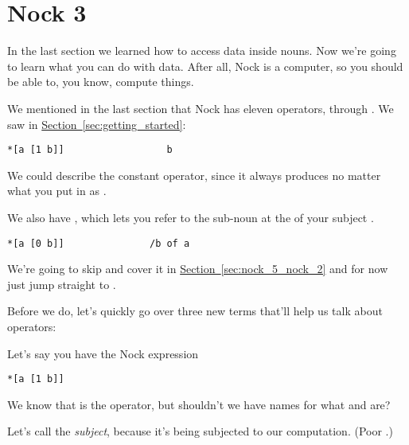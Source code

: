 \section{Nock 3}

\label{sec:nock_3}

In the last section we learned how to access data inside nouns. Now we're going
to learn what you can do with data. After all, Nock is a computer, so you
should be able to, you know, compute things.

We mentioned in the last section that Nock has eleven operators,  through
. We saw  in \hyperref[sec:getting_started]{Section~\ref{sec:getting_started}}:
\begin{framed_shaded}
\begin{Verbatim}[fontsize=\relsize{-2.5},commandchars=\\\{\}]
*[a [1 b]]                  b
\end{Verbatim}
\end{framed_shaded}
We could describe  the constant operator, since it always produces 
no matter what you put in as .

We also have , which lets you refer to the sub-noun at the  of
your subject .
\begin{framed_shaded}
\begin{Verbatim}[fontsize=\relsize{-2.5},commandchars=\\\{\}]
*[a [0 b]]               /b of a
\end{Verbatim}
\end{framed_shaded}
We're going to skip  and cover it in \hyperref[sec:nock_5_nock_2]{Section~\ref{sec:nock_5_nock_2}} and for now just jump
straight to .

Before we do, let's quickly go over three new terms that'll help us talk about
operators:

Let's say you have the Nock expression
\begin{framed_shaded}
\begin{Verbatim}[fontsize=\relsize{-2.5},commandchars=\\\{\}]
*[a [1 b]]
\end{Verbatim}
\end{framed_shaded}
We know that  is the operator, but shouldn't we have names for what  and
 are?

Let's call  the \emph{subject}, because it's being subjected to our computation.
(Poor .)

